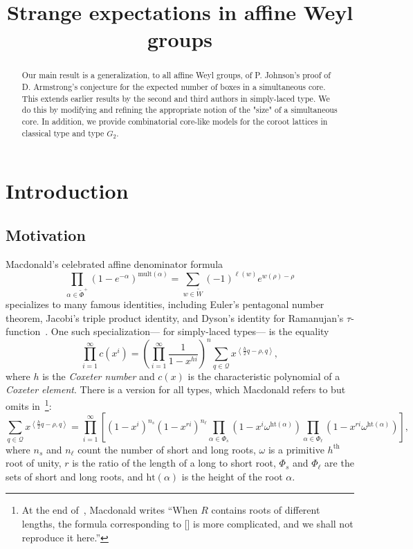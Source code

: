 \documentclass[ALCO,published]{cedram}
\title
{Strange expectations in affine Weyl groups}
\author[\initial{E.} \initial{N.} Stucky]{\firstname{Eric} \middlename{Nathan} \lastname{Stucky}}
\author[\initial{M.} Thiel]{\firstname{Marko} \lastname{Thiel}}
\author[\initial{N.} Williams]{\firstname{Nathan} \lastname{Williams}}
\newcommand{\darkblue}{\color{darkblue}} %
\newcommand{\defn}[1]{\emph{\darkblue #1}}
\newcommand{\wa}{\widetilde{W}}
\newcommand{\wphi}{\widetilde{\Phi}}
\newcommand{\Q}{\mathcal{Q}}
\begin{document}
\begin{abstract}
Our main result is a generalization, to all affine Weyl groups, of P. Johnson's proof of D. Armstrong's conjecture for the expected number of boxes in a simultaneous core. This extends earlier results by the second and third authors in simply-laced type. We do this by modifying and refining the appropriate notion of the "size" of a simultaneous core. In addition, we provide combinatorial core-like models for the coroot lattices in classical type and type $G_2$.
\end{abstract}


\maketitle

\section{Introduction}
\label{sec:introduction}

\subsection{Motivation}

Macdonald's celebrated affine denominator formula \[\prod_{\alpha \in \wphi^+} (1-e^{-\alpha})^{\mathrm{mult}(\alpha)} = \sum_{w \in \wa} (-1)^{\ell(w)} e^{w(\rho)-\rho}\]
specializes to many famous identities, including 
 Euler's pentagonal number theorem,
 Jacobi's triple product identity,
 and Dyson's identity for Ramanujan's $\tau$-function~\cite{macdonald1971affine,dyson1972missed}. One such specialization--- for simply-laced types--- is the equality
\begin{equation}\prod_{i=1}^\infty c(x^i) = \left(\prod_{i=1}^\infty \frac{1}{1-x^{hi}} \right)^n \sum_{q \in \mathcal{\Q}} x^{\left\langle \frac{h}{2}q - \rho,q\right\rangle},\label{eq:mac}\end{equation} where
$h$ is the \defn{Coxeter number} and
$c(x)$ is the characteristic polynomial of a \defn{Coxeter element}.  There is a version for all types, which Macdonald refers to but omits in~\cite{macdonald1971affine}\footnote{At the end of~\cite[Section 8]{macdonald1971affine}, Macdonald writes ``When $R$ contains roots of different lengths, the formula corresponding to [] is more complicated, and we shall not reproduce it here.''}:
\begin{equation*}\sum_{q \in \mathcal{\Q}} x^{\left\langle \frac{h}{2}q - \rho,q\right\rangle}
= \prod\limits_{i=1}^\infty\left[ (1-x^i)^{n_s}(1-x^{ri})^{n_\ell} \prod\limits_{\alpha \in \Phi_s} (1-x^i \omega^{\mathrm{ht}(\alpha)})\prod\limits_{\alpha \in \Phi_\ell} (1-x^{ri} \omega^{\mathrm{ht}(\alpha)})\right],\label{eq:thiel}\end{equation*}
where
$n_s$ and $n_\ell$ count the number of short and long roots,
$\omega$ is a primitive $h^\text{th}$ root of unity,
$r$ is the ratio of the length of a long to short root,
$\Phi_s$ and $\Phi_\ell$ are the sets of short and long roots, and
$\text{ht}(\alpha)$ is the height of the root $\alpha$.
\end{document}
